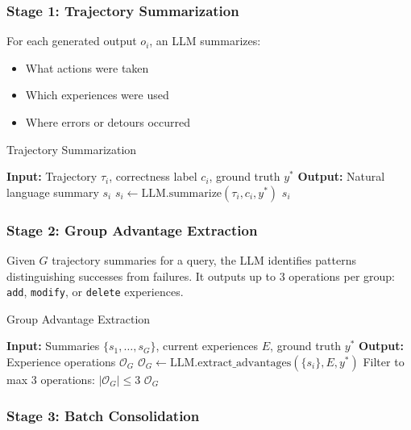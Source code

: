 \documentclass[11pt,a4paper]{article}
\begin{document}
\subsubsection{Stage 1: Trajectory Summarization}

For each generated output $o_i$, an LLM summarizes:
\begin{itemize}
\item What actions were taken
\item Which experiences were used
\item Where errors or detours occurred
\end{itemize}

\begin{algorithm}[H]
\caption{Trajectory Summarization}
\begin{algorithmic}[1]
\STATE \textbf{Input:} Trajectory $\tau_i$, correctness label $c_i$, ground truth $y^*$
\STATE \textbf{Output:} Natural language summary $s_i$
\STATE $s_i \leftarrow \text{LLM.summarize}(\tau_i, c_i, y^*)$
\RETURN $s_i$
\end{algorithmic}
\end{algorithm}

\subsubsection{Stage 2: Group Advantage Extraction}

Given $G$ trajectory summaries for a query, the LLM identifies patterns distinguishing successes from failures. It outputs up to 3 operations per group: \texttt{add}, \texttt{modify}, or \texttt{delete} experiences.

\begin{algorithm}[H]
\caption{Group Advantage Extraction}
\begin{algorithmic}[1]
\STATE \textbf{Input:} Summaries $\{s_1, \ldots, s_G\}$, current experiences $E$, ground truth $y^*$
\STATE \textbf{Output:} Experience operations $\mathcal{O}_G$
\STATE $\mathcal{O}_G \leftarrow \text{LLM.extract\_advantages}(\{s_i\}, E, y^*)$
\STATE Filter to max 3 operations: $|\mathcal{O}_G| \leq 3$
\RETURN $\mathcal{O}_G$
\end{algorithmic}
\end{algorithm}

\subsubsection{Stage 3: Batch Consolidation}
\end{document}

